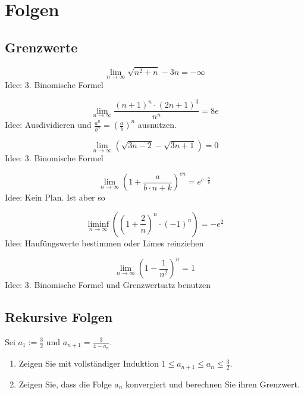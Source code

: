 \section{Folgen}
\subsection{Grenzwerte}
\begin{displaymath}
  \lim_{n \to \infty} {\sqrt{n^2 + n} - 3n} = - \infty
\end{displaymath}
Idee: 3. Binomische Formel

\begin{displaymath}
  \lim_{n \to \infty} \frac{(n+1)^n \cdot (2n+1)^3}{n^n} = 8e
\end{displaymath}
Idee: Ausdividieren und $\frac{a^n}{b^n} = \left( \frac{a}{b}\right) ^n$ ausnutzen.

\begin{displaymath}
  \lim_{n \to \infty} (\sqrt{3n-2} - \sqrt{3n+1}) = 0
\end{displaymath}
Idee: 3. Binomische Formel

\begin{displaymath}
  \lim_{n \to \infty} \left(1 + \frac{a}{b \cdot n + k}\right)^{cn} = e^{c \cdot \frac{a}{b}}
\end{displaymath}
Idee: Kein Plan. Ist aber so

\begin{displaymath}
  \liminf_{n \to \infty} \left(\left(1 + \frac{2}{n}\right)^n \cdot (-1)^n \right) = -e^2
\end{displaymath}
Idee: Haufüngswerte bestimmen oder Limes reinziehen

\begin{displaymath}
  \lim_{n \to \infty} \left(1 - \frac{1}{n^2}\right)^n = 1
\end{displaymath}
Idee: 3. Binomische Formel und Grenzwertsatz benutzen

\subsection{Rekursive Folgen}
Sei $a_1 := \frac{3}{2}$ und $a_{n+1} = \frac{3}{4-a_n}$.
\begin{enumerate}
    \item Zeigen Sie mit vollständiger Induktion $1 \leq a_{n+1} \leq a_n \leq \frac{3}{2}$.
    \item Zeigen Sie, dass die Folge $a_n$ konvergiert und berechnen Sie ihren Grenzwert.
\end{enumerate}

